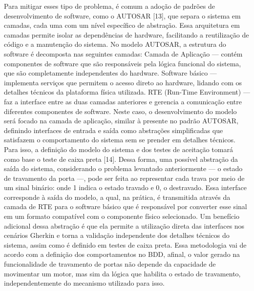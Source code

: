 Para mitigar esses tipo de problema, é comum a adoção de padrões de desenvolvimento de software, como o AUTOSAR [13], que separa o sistema em camadas, cada uma com um nível específico de abstração. Essa arquitetura em camadas permite isolar as dependências de hardware, facilitando a reutilização de código e a manutenção do sistema. 
No modelo AUTOSAR, a estrutura do software é decomposta nas seguintes camadas:
Camada de Aplicação — contém componentes de software que são responsáveis pela lógica funcional do sistema, que são completamente independentes do hardware.
Software básico — implementa serviços que permitem o acesso direto ao hardware, lidando com os detalhes técnicos da plataforma física utilizada.
RTE (Run-Time Environment) — faz a interface entre as duas camadas anteriores e gerencia a comunicação entre diferentes componentes de software.
Neste caso, o desenvolvimento do modelo será focado na camada de aplicação, similar à presente no padrão AUTOSAR, definindo interfaces de entrada e saída como abstrações simplificadas que satisfazem o comportamento do sistema sem se prender em detalhes técnicos. Para isso, a definição do modelo do sistema e dos testes de aceitação tomará como base o teste de caixa preta [14].
Dessa forma, uma possível abstração da saída do sistema, considerando o problema levantado anteriormente — o estado de travamento da porta —, pode ser feita ao representar cada trava por meio de um sinal binário: onde 1 indica o estado travado e 0, o destravado. Essa interface corresponde à saída do modelo, a qual, na prática, é transmitida através da camada de RTE para o software básico que é responsável por converter esse sinal em um formato compatível com o componente físico selecionado.
Um benefício adicional dessa abstração é que ela permite a utilização direta das interfaces nos cenários Gherkin e torna a validação independente dos detalhes técnicos do sistema, assim como é definido em testes de caixa preta. Essa metodologia vai de acordo com a definição dos comportamentos no BDD, afinal, o valor gerado na funcionalidade de travamento de portas não depende da capacidade de movimentar um motor, mas sim da lógica que habilita o estado de travamento, independentemente do mecanismo utilizado para isso.
